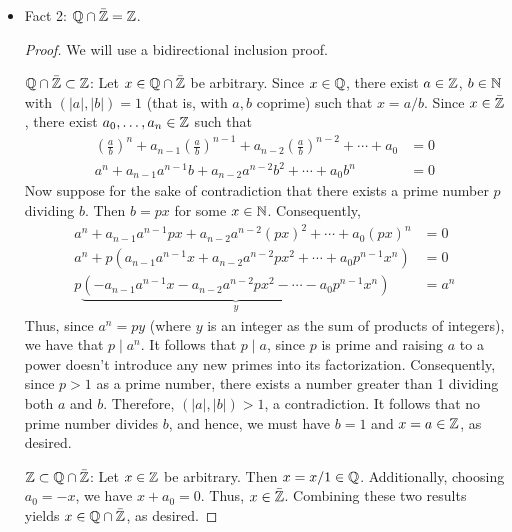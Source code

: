 \documentclass[../notes.tex]{subfiles}
\begin{document}
\begin{itemize}
\begin{proof}
        \begin{equation*}
            (dx)^n+da_{n-1}(dx)^{n-1}+\cdots+d^na_0 = 0
        \end{equation*}
        in $dx$ where each coefficient $d^ia_{n-i}$ is, by the definition of $d$, now an integer.
    \end{proof}
    \item Fact 2: $\mathbb{Q}\cap\bar{\mathbb{Z}}=\mathbb{Z}$.
    \begin{proof}
        We will use a bidirectional inclusion proof.\par
        \underline{$\mathbb{Q}\cap\bar{\mathbb{Z}}\subset\mathbb{Z}$}: Let $x\in\mathbb{Q}\cap\bar{\mathbb{Z}}$ be arbitrary. Since $x\in\mathbb{Q}$, there exist $a\in\mathbb{Z}$, $b\in\mathbb{N}$ with $(|a|,|b|)=1$ (that is, with $a,b$ coprime) such that $x=a/b$. Since $x\in\bar{\mathbb{Z}}$, there exist $a_0,\dots,a_n\in\mathbb{Z}$ such that
        \begin{align*}
            \left( \frac{a}{b} \right)^n+a_{n-1}\left( \frac{a}{b} \right)^{n-1}+a_{n-2}\left( \frac{a}{b} \right)^{n-2}+\cdots+a_0 &= 0\\
            a^n+a_{n-1}a^{n-1}b+a_{n-2}a^{n-2}b^2+\cdots+a_0b^n &= 0
        \end{align*}
        Now suppose for the sake of contradiction that there exists a prime number $p$ dividing $b$. Then $b=px$ for some $x\in\mathbb{N}$. Consequently,
        \begin{align*}
            a^n+a_{n-1}a^{n-1}px+a_{n-2}a^{n-2}(px)^2+\cdots+a_0(px)^n &= 0\\
            a^n+p(a_{n-1}a^{n-1}x+a_{n-2}a^{n-2}px^2+\cdots+a_0p^{n-1}x^n) &= 0\\
            p\underbrace{(-a_{n-1}a^{n-1}x-a_{n-2}a^{n-2}px^2-\cdots-a_0p^{n-1}x^n)}_y &= a^n
        \end{align*}
        Thus, since $a^n=py$ (where $y$ is an integer as the sum of products of integers), we have that $p\mid a^n$. It follows that $p\mid a$, since $p$ is prime and raising $a$ to a power doesn't introduce any new primes into its factorization. Consequently, since $p>1$ as a prime number, there exists a number greater than 1 dividing both $a$ and $b$. Therefore, $(|a|,|b|)>1$, a contradiction. It follows that no prime number divides $b$, and hence, we must have $b=1$ and $x=a\in\mathbb{Z}$, as desired.\par
        \underline{$\mathbb{Z}\subset\mathbb{Q}\cap\bar{\mathbb{Z}}$}: Let $x\in\mathbb{Z}$ be arbitrary. Then $x=x/1\in\mathbb{Q}$. Additionally, choosing $a_0=-x$, we have $x+a_0=0$. Thus, $x\in\bar{\mathbb{Z}}$. Combining these two results yields $x\in\mathbb{Q}\cap\bar{\mathbb{Z}}$, as desired.
    \end{proof}

\end{itemize}
\end{document}
